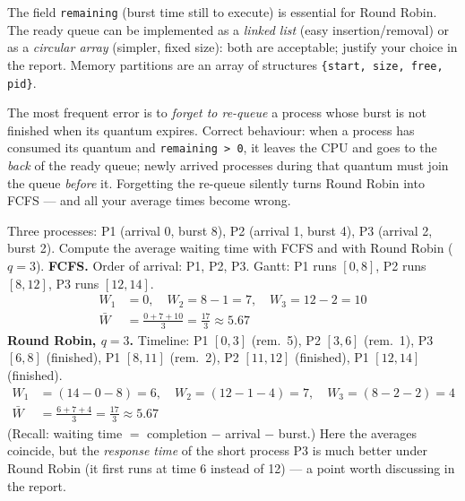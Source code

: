 \documentclass[11pt]{article}
\newcommand{\cle}[1]{{\popxbold\color{popdark}#1}}
\begin{document}
The field \texttt{remaining} (burst time still to execute) is essential for Round Robin. The \cle{ready queue} can be implemented as a \emph{linked list} (easy insertion/removal) or as a \emph{circular array} (simpler, fixed size): both are acceptable; justify your choice in the report. Memory partitions are an array of structures \texttt{\{start, size, free, pid\}}.

\begin{attention}
The most frequent error is to \emph{forget to re-queue} a process whose burst is not finished when its quantum expires. Correct behaviour: when a process has consumed its quantum and \texttt{remaining > 0}, it leaves the CPU and goes to the \emph{back} of the ready queue; newly arrived processes during that quantum must join the queue \emph{before} it. Forgetting the re-queue silently turns Round Robin into FCFS --- and all your average times become wrong.
\end{attention}

\begin{exoresolu}
Three processes: P1 (arrival 0, burst 8), P2 (arrival 1, burst 4), P3 (arrival 2, burst 2). Compute the average waiting time with FCFS and with Round Robin ($q = 3$).
\tcblower
\textbf{FCFS.} Order of arrival: P1, P2, P3. Gantt: P1 runs $[0,8]$, P2 runs $[8,12]$, P3 runs $[12,14]$.
\begin{align*}
W_1 &= 0, \quad W_2 = 8 - 1 = 7, \quad W_3 = 12 - 2 = 10\\
\bar{W} &= \frac{0 + 7 + 10}{3} = \frac{17}{3} \approx 5.67
\end{align*}
\textbf{Round Robin, $q=3$.} Timeline: P1 $[0,3]$ (rem.\ 5), P2 $[3,6]$ (rem.\ 1), P3 $[6,8]$ (finished), P1 $[8,11]$ (rem.\ 2), P2 $[11,12]$ (finished), P1 $[12,14]$ (finished).
\begin{align*}
W_1 &= (14 - 0 - 8) = 6, \quad W_2 = (12 - 1 - 4) = 7, \quad W_3 = (8 - 2 - 2) = 4\\
\bar{W} &= \frac{6 + 7 + 4}{3} = \frac{17}{3} \approx 5.67
\end{align*}
(Recall: waiting time $=$ completion $-$ arrival $-$ burst.) Here the averages coincide, but the \emph{response time} of the short process P3 is much better under Round Robin (it first runs at time 6 instead of 12) --- a point worth discussing in the report.
\end{exoresolu}
\end{document}
